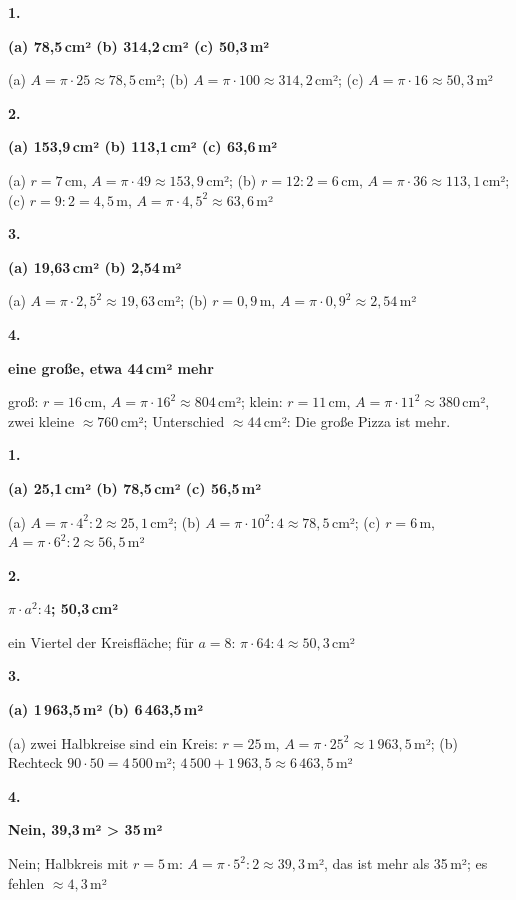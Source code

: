 \documentclass[11pt]{article}
\newcommand{\lsg}[3]{\par\noindent\begin{minipage}[t]{9mm}\textbf{#1}\end{minipage}%
  \begin{minipage}[t]{52mm}\raggedright\bfseries\boldmath #2\end{minipage}\hspace{3mm}%
  \begin{minipage}[t]{\dimexpr\linewidth-64mm\relax}\raggedright\small #3\end{minipage}\par\vspace{4pt}}
\newlength{\kr}
\begin{document}
\par\smallskip
{}\par
\par\Needspace{25mm}\vspace{6pt}\noindent\colorbox{black!12}{}\hspace{2mm}{\bfseries Fläche aus Radius oder Durchmesser}\par\vspace{4pt}
\lsg{1.}{(a) 78,5\,cm² (b) 314,2\,cm² (c) 50,3\,m²}{(a) $A = \pi \cdot 25 \approx 78{,}5$\,cm²; (b) $A = \pi \cdot 100 \approx 314{,}2$\,cm²; (c) $A = \pi \cdot 16 \approx 50{,}3$\,m²}
\lsg{2.}{(a) 153,9\,cm² (b) 113,1\,cm² (c) 63,6\,m²}{(a) $r = 7$\,cm, $A = \pi \cdot 49 \approx 153{,}9$\,cm²; (b) $r = 12 : 2 = 6$\,cm, $A = \pi \cdot 36 \approx 113{,}1$\,cm²; (c) $r = 9 : 2 = 4{,}5$\,m, $A = \pi \cdot 4{,}5^2 \approx 63{,}6$\,m²}
\lsg{3.}{(a) 19,63\,cm² (b) 2,54\,m²}{(a) $A = \pi \cdot 2{,}5^2 \approx 19{,}63$\,cm²; (b) $r = 0{,}9$\,m, $A = \pi \cdot 0{,}9^2 \approx 2{,}54$\,m²}
\lsg{4.}{eine große, etwa 44\,cm² mehr}{groß: $r = 16$\,cm, $A = \pi \cdot 16^2 \approx 804$\,cm²; klein: $r = 11$\,cm, $A = \pi \cdot 11^2 \approx 380$\,cm², zwei kleine $\approx 760$\,cm²; Unterschied $\approx 44$\,cm²: Die große Pizza ist mehr.}
\par\Needspace{25mm}\vspace{6pt}\noindent\colorbox{black!12}{}\hspace{2mm}{\bfseries Halbkreis und Viertelkreis}\par\vspace{4pt}
\lsg{1.}{(a) 25,1\,cm² (b) 78,5\,cm² (c) 56,5\,m²}{(a) $A = \pi \cdot 4^2 : 2 \approx 25{,}1$\,cm²; (b) $A = \pi \cdot 10^2 : 4 \approx 78{,}5$\,cm²; (c) $r = 6$\,m, $A = \pi \cdot 6^2 : 2 \approx 56{,}5$\,m²}
\lsg{2.}{$\pi \cdot a^2 : 4$; 50,3\,cm²}{ein Viertel der Kreisfläche; für $a = 8$: $\pi \cdot 64 : 4 \approx 50{,}3$\,cm²}
\lsg{3.}{(a) 1\,963,5\,m² (b) 6\,463,5\,m²}{(a) zwei Halbkreise sind ein Kreis: $r = 25$\,m, $A = \pi \cdot 25^2 \approx 1\,963{,}5$\,m²; (b) Rechteck $90 \cdot 50 = 4\,500$\,m²; $4\,500 + 1\,963{,}5 \approx 6\,463{,}5$\,m²}
\lsg{4.}{Nein, 39,3\,m² > 35\,m²}{Nein; Halbkreis mit $r = 5$\,m: $A = \pi \cdot 5^2 : 2 \approx 39{,}3$\,m², das ist mehr als 35\,m²; es fehlen $\approx 4{,}3$\,m²}
\end{document}
